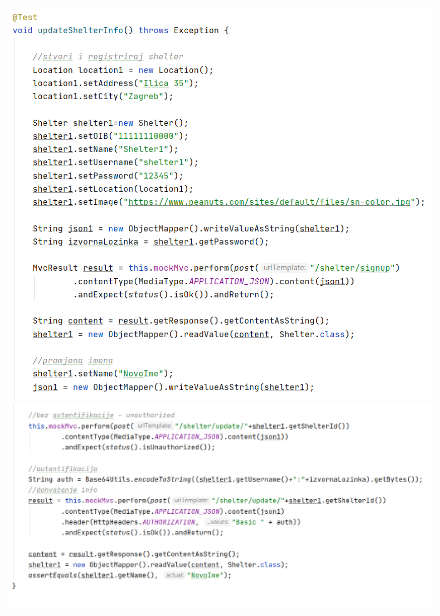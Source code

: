 	 		\begin{figure}[H]
	 				\hspace*{-0.5in}
	 				\includegraphics[scale=0.73]{slike/shelter3.1.PNG}
	 				\hspace*{-0.45in}	
	 				\includegraphics[scale=0.73]{slike/shelter3.2.PNG} %
	 			\centering
	 		\end{figure}
	 		
 		
 		
